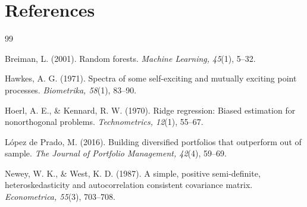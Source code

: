 \documentclass[11pt]{article}
\begin{document}
\section*{References}
\begin{thebibliography}{99}

Breiman, L. (2001). Random forests. \textit{Machine Learning, 45}(1), 5--32.

Hawkes, A. G. (1971). Spectra of some self-exciting and mutually exciting point processes. \textit{Biometrika, 58}(1), 83--90.

Hoerl, A. E., \& Kennard, R. W. (1970). Ridge regression: Biased estimation for nonorthogonal problems. \textit{Technometrics, 12}(1), 55--67.

L\'opez de Prado, M. (2016). Building diversified portfolios that outperform out of sample. \textit{The Journal of Portfolio Management, 42}(4), 59--69.

Newey, W. K., \& West, K. D. (1987). A simple, positive semi-definite, heteroskedasticity and autocorrelation consistent covariance matrix. \textit{Econometrica, 55}(3), 703--708.

\end{thebibliography}
\end{document}
